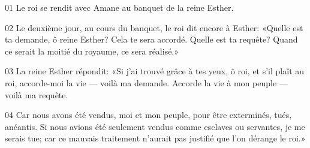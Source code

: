 01 Le roi se rendit avec Amane au banquet de la reine Esther.

02 Le deuxième jour, au cours du banquet, le roi dit encore à Esther: «Quelle est ta demande, ô reine Esther? Cela te sera accordé. Quelle est ta requête? Quand ce serait la moitié du royaume, ce sera réalisé.»

03 La reine Esther répondit: «Si j’ai trouvé grâce à tes yeux, ô roi, et s’il plaît au roi, accorde-moi la vie --- voilà ma demande. Accorde la vie à mon peuple --- voilà ma requête.

04 Car nous avons été vendus, moi et mon peuple, pour être exterminés, tués, anéantis. Si nous avions été seulement vendus comme esclaves ou servantes, je me serais tue; car ce mauvais traitement n’aurait pas justifié que l’on dérange le roi.»
